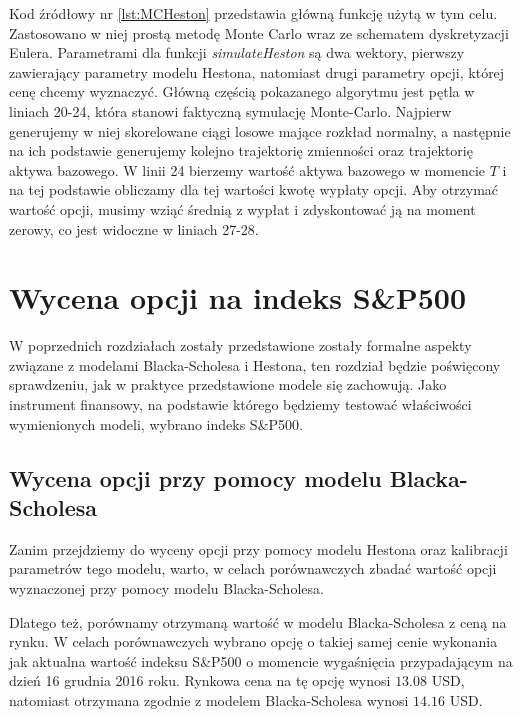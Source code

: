 \documentclass{pracamgr}
\begin{document}
Kod źródłowy nr \ref{lst:MCHeston} przedstawia główną funkcję użytą w tym celu. 
Zastosowano w niej prostą metodę Monte Carlo wraz ze schematem dyskretyzacji Eulera. 
Parametrami dla funkcji \textit{simulateHeston} są dwa wektory, pierwszy zawierający
parametry modelu Hestona, natomiast drugi parametry opcji, której cenę chcemy wyznaczyć. 
Główną częścią pokazanego algorytmu jest pętla w liniach 20-24, która stanowi faktyczną symulację
Monte-Carlo. Najpierw generujemy w niej skorelowane ciągi losowe mające rozkład normalny, 
a następnie na ich podstawie generujemy kolejno trajektorię zmienności oraz trajektorię aktywa
bazowego. W linii 24 bierzemy wartość aktywa bazowego w momencie $T$ i na tej podstawie obliczamy dla
tej wartości kwotę wypłaty opcji. Aby otrzymać wartość opcji, musimy wziąć średnią z wypłat i
zdyskontować ją na moment zerowy, co jest widoczne w liniach 27-28.


\chapter{Wycena opcji na indeks S\&P500}\label{r:sp}


W poprzednich rozdziałach zostały przedstawione zostały formalne aspekty związane z modelami 
Blacka-Scholesa i Hestona, ten rozdział będzie poświęcony sprawdzeniu, jak w praktyce przedstawione 
modele się zachowują.
Jako instrument finansowy, na podstawie którego będziemy testować właściwości wymienionych modeli, 
wybrano indeks S\&P500. 

\section{Wycena opcji przy pomocy modelu Blacka-Scholesa}

Zanim przejdziemy do wyceny opcji  przy pomocy modelu Hestona oraz kalibracji
parametrów tego modelu, warto, w celach porównawczych zbadać wartość opcji 
wyznaczonej przy pomocy modelu Blacka-Scholesa. 


Dlatego też, porównamy otrzymaną wartość w modelu Blacka-Scholesa z ceną na rynku.
W celach porównawczych wybrano opcję o takiej samej cenie wykonania jak aktualna wartość indeksu 
S\&P500 o momencie wygaśnięcia przypadającym na dzień 16 grudnia 2016 roku. 
Rynkowa cena na tę opcję wynosi $13.08$ USD, natomiast otrzymana zgodnie z modelem Blacka-Scholesa 
wynosi $14.16$ USD.
\end{document}
